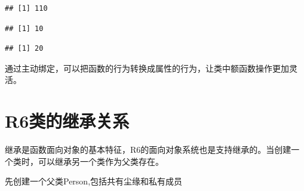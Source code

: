 \documentclass[]{book}
\newenvironment{Shaded}{\begin{snugshade}}{\end{snugshade}}
\newcommand{\DecValTok}[1]{\textcolor[rgb]{0.00,0.00,0.81}{#1}}
\newcommand{\StringTok}[1]{\textcolor[rgb]{0.31,0.60,0.02}{#1}}
\newcommand{\CommentTok}[1]{\textcolor[rgb]{0.56,0.35,0.01}{\textit{#1}}}
\newcommand{\OperatorTok}[1]{\textcolor[rgb]{0.81,0.36,0.00}{\textbf{#1}}}
\newcommand{\NormalTok}[1]{#1}
\begin{document}
\begin{Shaded}
\end{Shaded}

\begin{verbatim}
## [1] 110
\end{verbatim}

\begin{Shaded}
\end{Shaded}

\begin{verbatim}
## [1] 10
\end{verbatim}

\begin{Shaded}
\end{Shaded}

\begin{verbatim}
## [1] 20
\end{verbatim}

通过主动绑定，可以把函数的行为转换成属性的行为，让类中额函数操作更加灵活。

\section{R6类的继承关系}\label{r6}

继承是函数面向对象的基本特征，R6的面向对象系统也是支持继承的。当创建一个类时，可以继承另一个类作为父类存在。

先创建一个父类Person,包括共有尘缘和私有成员
\end{document}
